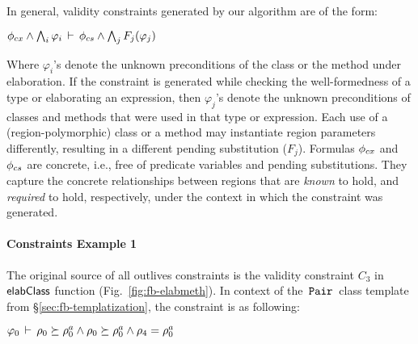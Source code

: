 In general, validity constraints generated by our algorithm are of the
form:
\begin{center}
\( \phi_{cx} \wedge \bigwedge_{i}\varphi_i\,\vdash\,\phi_{cs} \wedge \bigwedge_{j}F_j(\varphi_j)\)
\end{center}
Where $\varphi_i$'s denote the unknown preconditions of the class or
the method under elaboration. If the constraint is generated while
checking the well-formedness of a type or elaborating an expression,
then $\varphi_j$'s denote the unknown preconditions of classes and
methods that were used in that type or expression.  Each use of a
(region-polymorphic) class or a method may instantiate region
parameters differently, resulting in a different pending substitution
($F_j$). Formulas $\phi_{cx}$ and $\phi_{cs}$ are concrete, i.e., free
of predicate variables and pending substitutions.  They capture the
concrete relationships between regions that are \emph{known} to hold,
and \emph{required} to hold, respectively, under the context in which
the constraint was generated.

\paragraph{Constraints Example 1} The original source of all
outlives constraints is the validity constraint $C_3$ in ${\sf elabClass}$
function (Fig.~\ref{fig:fb-elabmeth}). In context of the $\,{\tt Pair}\,$
class template from \S\ref{sec:fb-templatization}, the constraint is
as following:
\begin{center}
  \(\varphi_0\,\vdash\,\rho_0 \succeq \rho^a_0 \wedge \rho_0
  \succeq \rho^a_0 \wedge \rho_4 = \rho^a_0\)
\end{center}

